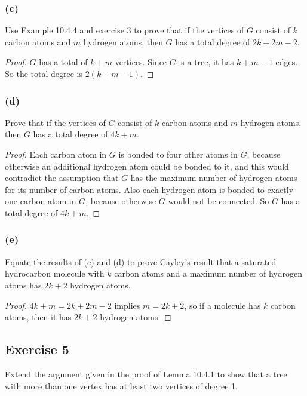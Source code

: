 \documentclass[14pt]{extarticle}
\begin{document}
\subsubsection{(c)}
Use Example 10.4.4 and exercise 3 to prove that if the vertices of \(G\) consist of \(k\) carbon atoms and \(m\) 
hydrogen atoms, then \(G\) has a total degree of \(2k + 2m - 2\).

\begin{proof}
\(G\) has a total of \(k+m\) vertices. Since \(G\) is a tree, it has \(k+m-1\) edges. So the total degree is \(2(k+m-1)\).
\end{proof}

\subsubsection{(d)}
Prove that if the vertices of \(G\) consist of \(k\) carbon atoms and \(m\) hydrogen atoms, then \(G\) has a total degree 
of \(4k + m\).

\begin{proof}
Each carbon atom in \(G\) is bonded to four other atoms in \(G\), because otherwise an additional hydrogen atom could be 
bonded to it, and this would contradict the assumption that \(G\) has the maximum number of hydrogen atoms for its number 
of carbon atoms. Also each hydrogen atom is bonded to exactly one carbon atom in \(G\), because otherwise \(G\) would not be 
connected. So \(G\) has a total degree of \(4k+m\).
\end{proof}

\subsubsection{(e)}
Equate the results of (c) and (d) to prove Cayley’s result that a saturated hydrocarbon molecule with \(k\) carbon atoms 
and a maximum number of hydrogen atoms has \(2k + 2\) hydrogen atoms.

\begin{proof}
\(4k+m = 2k+2m-2\) implies \(m = 2k+2\), so if a molecule has \(k\) carbon atoms, then it has \(2k+2\) hydrogen atoms.
\end{proof}

\subsection{Exercise 5}
Extend the argument given in the proof of Lemma 10.4.1 to show that a tree with more than one vertex has at least two 
vertices of degree 1.
\end{document}
